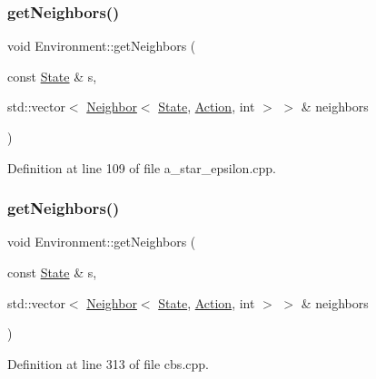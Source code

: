 \subsubsection{\texorpdfstring{get\+Neighbors()}{getNeighbors()}\hspace{0.1cm}{\footnotesize\ttfamily [2/4]}}
{\footnotesize\ttfamily void Environment\+::get\+Neighbors (\begin{DoxyParamCaption}\item[{const \hyperlink{struct_state}{State} \&}]{s,  }\item[{std\+::vector$<$ \hyperlink{structlib_multi_robot_planning_1_1_neighbor}{Neighbor}$<$ \hyperlink{struct_state}{State}, \hyperlink{a__star_8cpp_a8bb1ef53467e4f61410d12822d922498}{Action}, int $>$ $>$ \&}]{neighbors }\end{DoxyParamCaption})\hspace{0.3cm}{\ttfamily [inline]}}



Definition at line 109 of file a\+\_\+star\+\_\+epsilon.\+cpp.

\mbox{\label{class_environment_a4ae69480c6b9e716f282839dc4f323c0}} 
\subsubsection{\texorpdfstring{get\+Neighbors()}{getNeighbors()}\hspace{0.1cm}{\footnotesize\ttfamily [3/4]}}
{\footnotesize\ttfamily void Environment\+::get\+Neighbors (\begin{DoxyParamCaption}\item[{const \hyperlink{struct_state}{State} \&}]{s,  }\item[{std\+::vector$<$ \hyperlink{structlib_multi_robot_planning_1_1_neighbor}{Neighbor}$<$ \hyperlink{struct_state}{State}, \hyperlink{a__star_8cpp_a8bb1ef53467e4f61410d12822d922498}{Action}, int $>$ $>$ \&}]{neighbors }\end{DoxyParamCaption})\hspace{0.3cm}{\ttfamily [inline]}}



Definition at line 313 of file cbs.\+cpp.

\mbox{\label{class_environment_a4ae69480c6b9e716f282839dc4f323c0}} 
